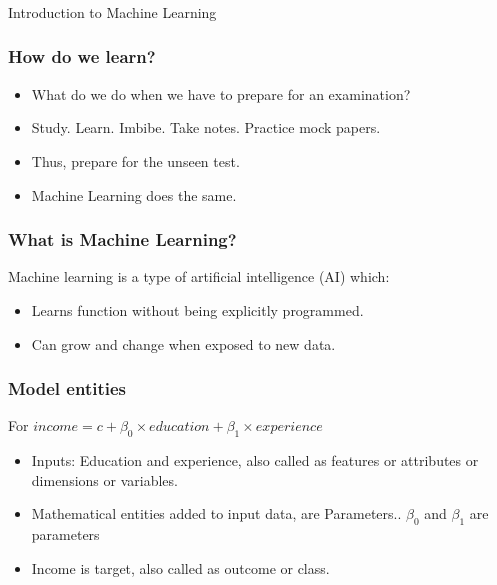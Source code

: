 \begin{frame}[fragile]\frametitle{}
\begin{center}
{\Large Introduction to Machine Learning}
\end{center}
\end{frame}

\begin{frame}[fragile]\frametitle{How do we learn?}
\begin{itemize}
	\item What do we do when we have to prepare for an examination? 
	\item Study. Learn. Imbibe. Take notes. Practice mock papers.
	\item  Thus,  prepare for the unseen test.
	\item Machine Learning does the same.
\end{itemize}
\end{frame}



\begin{frame}[fragile]\frametitle{What is Machine Learning?}
Machine learning is a type of artificial intelligence (AI) which:
\begin{itemize}
\item Learns function without being explicitly programmed. 
\item Can grow and change when exposed to new data. 
\end{itemize}
\end{frame}


\begin{frame}[fragile]\frametitle{Model entities}
For $income = c + \beta_0 \times education + \beta_1 \times experience$
\begin{itemize}
\item Inputs: Education and experience, also called as features or attributes or dimensions or variables.
\item Mathematical entities added to input data, are Parameters.. $\beta_0$ and $\beta_1$ are parameters
\item Income is target, also called as outcome or class.
\end{itemize}
\end{frame}

